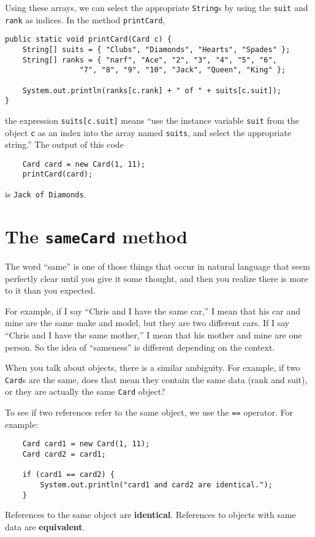 \documentclass[12pt]{book}
\theoremstyle{definition}
\begin{document}
Using these arrays, we can select the appropriate {\tt String}s by
using the {\tt suit} and {\tt rank} as indices.  In the method
{\tt printCard},

\begin{lstlisting}
public static void printCard(Card c) {
    String[] suits = { "Clubs", "Diamonds", "Hearts", "Spades" };
    String[] ranks = { "narf", "Ace", "2", "3", "4", "5", "6",
                 "7", "8", "9", "10", "Jack", "Queen", "King" };

    System.out.println(ranks[c.rank] + " of " + suits[c.suit]);
}
\end{lstlisting}

the expression {\tt suits[c.suit]} means ``use the instance variable
{\tt suit} from the object {\tt c} as an index into the array named
{\tt suits}, and select the appropriate string.''  The output of this
code

\begin{lstlisting}
    Card card = new Card(1, 11);
    printCard(card);
\end{lstlisting}
%
is {\tt Jack of Diamonds}.


\section{The {\tt sameCard} method}
\label{equivalence}

The word ``same'' is one of those things that occur in natural
language that seem perfectly clear until you give it some thought,
and then you realize there is more to it than you expected.

For example, if I say ``Chris and I have the same car,'' I
mean that his car and mine are the same make and model, but they are
two different cars.  If I say ``Chris and I have the same mother,'' I
mean that his mother and mine are one person.  So the
idea of ``sameness'' is different depending on the context.

When you talk about objects, there is a similar ambiguity.  For
example, if two {\tt Card}s are the same, does that mean they
contain the same data (rank and suit), or they are actually
the same {\tt Card} object?

To see if two references refer to the same object, we use
the {\tt ==} operator.  For example:

\begin{lstlisting}
    Card card1 = new Card(1, 11);
    Card card2 = card1;

    if (card1 == card2) {
        System.out.println("card1 and card2 are identical.");
    }
\end{lstlisting}
% 
References to
the same object are {\bf identical}.  References
to objects with same data are {\bf equivalent}.
\end{document}
